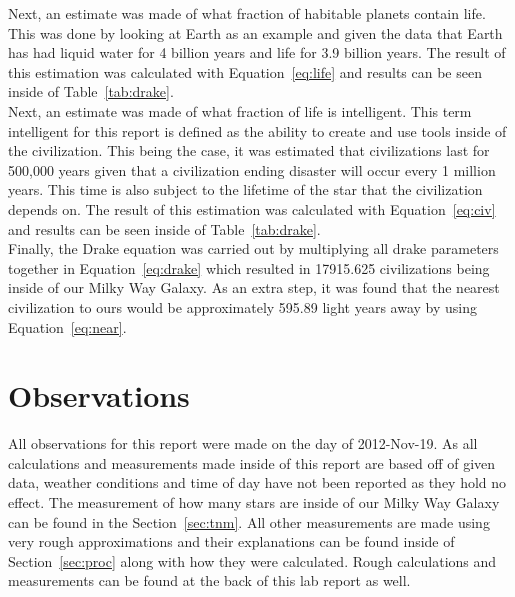 \documentclass{article}
\begin{document}
Next, an estimate was made of what fraction of habitable planets contain life. This was done by looking at Earth as an example and given the data
that Earth has had liquid water for 4 billion years and life for 3.9 billion years. The result of this estimation was calculated with Equation~\ref{eq:life} 
and results can be seen inside of Table~\ref{tab:drake}.\\

Next, an estimate was made of what fraction of life is intelligent. This term intelligent for this report is defined as the ability to create and use
tools inside of the civilization. This being the case, it was estimated that civilizations last for 500,000 years given that a civilization ending 
disaster will occur every 1 million years. This time is also subject to the lifetime of the star that the civilization depends on.
The result of this estimation was calculated with Equation~\ref{eq:civ} and results can be seen inside of Table~\ref{tab:drake}.\\

Finally, the Drake equation was carried out by multiplying all drake parameters together in Equation~\ref{eq:drake} which resulted in
17915.625 civilizations being inside of our Milky Way Galaxy. As an extra step, it was found that the nearest civilization to ours would
be approximately 595.89 light years away by using Equation~\ref{eq:near}.\\



\section{Observations}

All observations for this report were made on the day of 2012-Nov-19. As all calculations and measurements made inside of this report are based off of
given data, weather conditions and time of day have not been reported as they hold no effect. The measurement of how many stars are inside of our
Milky Way Galaxy can be found in the Section~\ref{sec:tnm}. All other measurements are made using very rough approximations and their explanations
can be found inside of Section~\ref{sec:proc} along with how they were calculated. Rough calculations and measurements can be found at the back of
this lab report as well.\\
\end{document}
